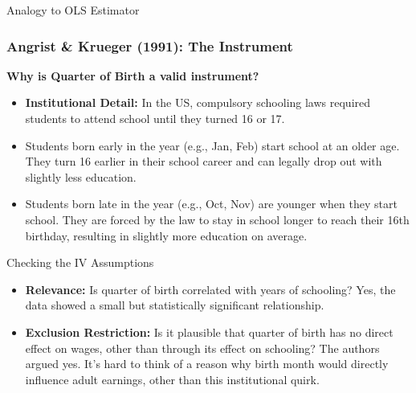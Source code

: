 \documentclass[
  ignorenonframetext,
  aspectratio=169]{beamer}
\begin{document}
\begin{frame}{Analogy to OLS Estimator}
\begin{frame}
\frametitle{Angrist \& Krueger (1991): The Instrument}
\textbf{Why is Quarter of Birth a valid instrument?}
\begin{itemize}
    \item \textbf{Institutional Detail:} In the US, compulsory schooling laws required students to attend school until they turned 16 or 17.
    \item Students born early in the year (e.g., Jan, Feb) start school at an older age. They turn 16 earlier in their school career and can legally drop out with slightly less education.
    \item Students born late in the year (e.g., Oct, Nov) are younger when they start school. They are forced by the law to stay in school longer to reach their 16th birthday, resulting in slightly more education on average.
\end{itemize}
\pause
\begin{block}{Checking the IV Assumptions}
\begin{itemize}
    \item \textbf{Relevance:} Is quarter of birth correlated with years of schooling? Yes, the data showed a small but statistically significant relationship.
    \item \textbf{Exclusion Restriction:} Is it plausible that quarter of birth has no direct effect on wages, other than through its effect on schooling? The authors argued yes. It's hard to think of a reason why birth month would directly influence adult earnings, other than this institutional quirk.
\end{itemize}
\end{block}
\end{frame}


\end{frame}
\end{document}
